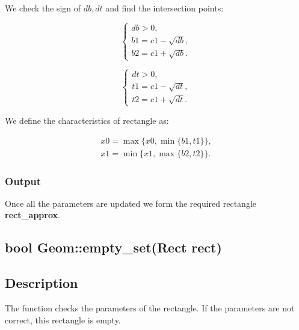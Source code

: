 \documentclass{report}
\begin{document}
\begin{itemize}
\begin{itemize}
		We check the sign of $db, dt$ and find the intersection points:
			
		\begin{equation}
			\begin{cases}
				db > 0,\\ 
				b1 = c1 - \sqrt {db},\\
				b2 = c1 + \sqrt {db}.
			\end{cases}
		\end{equation}
		
		\begin{equation}
			\begin{cases}
				dt > 0,\\ 
				t1 = c1 - \sqrt {dt},\\
				t2 = c1 + \sqrt {dt}.
			\end{cases}
		\end{equation}
			
		We define the characteristics of rectangle as:
		
			\begin{equation}
				\begin{gathered}
					x0 = \max\{x0, \min\{b1, t1\}\},\\
					x1 = \min\{x1, \max\{b2, t2\}\}.
			\end{gathered}
		\end{equation}
	
		\end{itemize}	
	\end{itemize}

	\subsubsection*{Output}


Once all the parameters are updated we form the required rectangle {\bfseries rect\_approx}.

\newpage
\begin{center} 
	\section*{\bfseries bool Geom::empty\_set(Rect rect)}
\end{center} 

\subsection*{Description}

The function checks the parameters of the rectangle. If the parameters are not correct, this rectangle is empty. 
\end{document}
